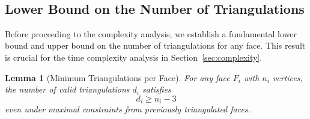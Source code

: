 ﻿﻿\documentclass[12pt,a4paper]{article}
\newtheorem{lemma}[theorem]{Lemma}
\theoremstyle{definition}
\theoremstyle{remark}
\begin{document}
\subsection{Lower Bound on the Number of Triangulations}

Before proceeding to the complexity analysis, we establish a fundamental lower bound and upper bound on the number of triangulations for any face. This result is crucial for the time complexity analysis in Section~\ref{sec:complexity}.

\begin{lemma}[Minimum Triangulations per Face]
	\label{lem:min_triangulations}
	For any face $F_i$ with $n_i$ vertices, the number of valid triangulations $d_i$ satisfies
	\[
		d_i \geq n_i - 3
	\]
	even under maximal constraints from previously triangulated faces.
\end{lemma}
\end{document}

